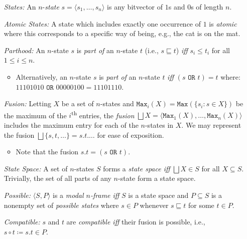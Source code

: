 \documentclass[a4paper, 11pt]{article} %
\newcommand{\tuple}[1]{\langle#1\rangle} %
\newcommand{\set}[1]{\lbrace#1\rbrace} %
\renewcommand{\max}[0]{\texttt{Max}}
\begin{document}
\begin{enumerate}
  \item[\it States:] An $n$-\textit{state} $s=\tuple{s_1,\ldots,s_n}$ is any bitvector of $1$s and $0$s of length $n$.
  \item[\it Atomic States:] A state which includes exactly one occurrence of $1$ is \textit{atomic} where this corresponds to a specific way of being, e.g., the cat is on the mat.
  \item[\it Parthood:] An $n$-state $s$ is \textit{part of} an $n$-state $t$ (i.e., $s\sqsubseteq t$) \textit{iff} $s_i\leq t_i$ for all $1\leq i\leq n$.
    \begin{itemize}
      \item Alternatively, an $n$-state $s$ is \textit{part of} an $n$-state $t$ \textit{iff} $(s \texttt{ OR } t) = t$  where: $11101010 \texttt{ OR } 00000100 = 11101110$. %
    \end{itemize}
  \item[\it Fusion:] Letting $X$ be a set of $n$-states and $\max_i(X)=\max(\set{s_i:s\in X})$ be the maximum of the $i$\textsuperscript{th} entries, the \textit{fusion} $\bigsqcup X=\tuple{\max_1(X),\ldots,\max_n(X)}$ includes the maximum entry for each of the $n$-states in $X$.
    We may represent the fusion $\bigsqcup\set{s,t,\ldots}=s.t.\ldots$ for ease of exposition.
    \begin{itemize}
      \item Note that the fusion $s.t = (s \texttt{ OR } t)$.
    \end{itemize}
  \item[\it State Space:] A set of $n$-states $S$ forms a \textit{state space iff} $\bigsqcup X\in S$ for all $X\subseteq S$. Trivially, the set of all parts of any $n$-state form a state space.
  \item[\it Possible:] $\tuple{S,P}$ is a \textit{modal $n$-frame iff} $S$ is a state space and $P\subseteq S$ is a nonempty set of \textit{possible states} where $s\in P$ whenever $s\sqsubseteq t$ for some $t\in P$.
  \item[\it Compatible:] $s$ and $t$ are \textit{compatible iff} their fusion is possible, i.e., $s\circ t\coloneq s.t\in P$.

\end{enumerate}
\end{document}
